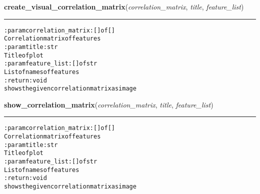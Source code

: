     \label{hal:ml:analysis:correlation:create_visual_correlation_matrix}

    \vspace{0.5ex}

\hspace{.8\funcindent}\begin{boxedminipage}{\funcwidth}

    \raggedright \textbf{create\_visual\_correlation\_matrix}(\textit{correlation\_matrix}, \textit{title}, \textit{feature\_list})

    \vspace{-1.5ex}

    \rule{\textwidth}{0.5\fboxrule}
\setlength{\parskip}{2ex}
\begin{alltt}

:param correlation\_matrix: [] of []
    Correlation matrix of features
:param title: str
    Title of plot
:param feature\_list: [] of str
    List of names of features
:return: void
    shows the given correlation matrix as image
\end{alltt}

\setlength{\parskip}{1ex}
    \end{boxedminipage}

    \label{hal:ml:analysis:correlation:show_correlation_matrix}

    \vspace{0.5ex}

\hspace{.8\funcindent}\begin{boxedminipage}{\funcwidth}

    \raggedright \textbf{show\_correlation\_matrix}(\textit{correlation\_matrix}, \textit{title}, \textit{feature\_list})

    \vspace{-1.5ex}

    \rule{\textwidth}{0.5\fboxrule}
\setlength{\parskip}{2ex}
\begin{alltt}

:param correlation\_matrix: [] of []
    Correlation matrix of features
:param title: str
    Title of plot
:param feature\_list: [] of str
    List of names of features
:return: void
    shows the given correlation matrix as image
\end{alltt}

\setlength{\parskip}{1ex}
    \end{boxedminipage}

